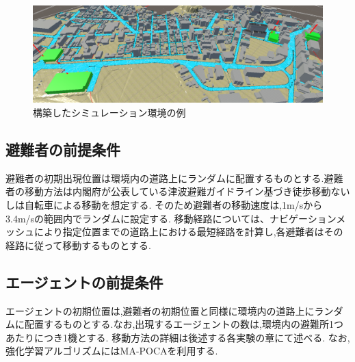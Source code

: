 \begin{figure}[H] 
  \centering 
  \includegraphics[width=1.0\textwidth]{Figures/2025-01-10 025916.png}
  \caption{構築したシミュレーション環境の例} 
  \label{fig:01} 
\end{figure}
\subsection{避難者の前提条件}
避難者の初期出現位置は環境内の道路上にランダムに配置するものとする.避難者の移動方法は内閣府が公表している津波避難ガイドライン基づき徒歩移動ないしは自転車による移動を想定する.
そのため避難者の移動速度は,1m/sから3.4m/sの範囲内でランダムに設定する.
移動経路については、ナビゲーションメッシュにより指定位置までの道路上における最短経路を計算し,各避難者はその経路に従って移動するものとする.
\subsection{エージェントの前提条件}
エージェントの初期位置は,避難者の初期位置と同様に環境内の道路上にランダムに配置するものとする.なお,出現するエージェントの数は,環境内の避難所1つあたりにつき1機とする.
移動方法の詳細は後述する各実験の章にて述べる.
なお,強化学習アルゴリズムにはMA-POCAを利用する.


